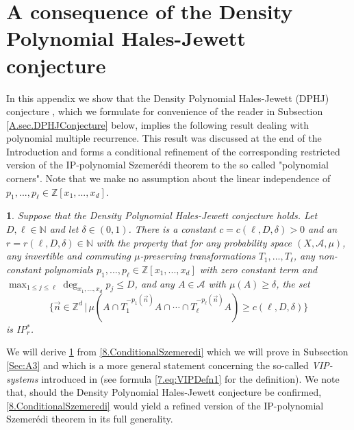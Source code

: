\documentclass[11pt,american,preprint]{elsarticle}
\numberwithin{equation}{section}
\theoremstyle{plain}
\newtheorem{thm}{\protect\theoremname}[section]
\theoremstyle{plain*}
\theoremstyle{plain}
\theoremstyle{plain*}
\theoremstyle{plain}
\theoremstyle{plain*}
\theoremstyle{remark}
\theoremstyle{remark*}
\theoremstyle{remark}
\theoremstyle{remark*}
\theoremstyle{remark}
\theoremstyle{remark*}
\theoremstyle{plain}
\theoremstyle{definition}
\theoremstyle{plain}
\theoremstyle{plain} %
\providecommand{\theoremname}{Theorem}
\newcommand{\N}{\mathbb{N}}
\newcommand{\Z}{\mathbb{Z}}
\begin{document}
\section{A consequence of the Density Polynomial Hales-Jewett conjecture}\label{Sec:A}
 In this appendix we show that the Density Polynomial Hales-Jewett (DPHJ) conjecture \cite[p. 56]{ERTaU}, which we formulate for convenience of the reader in Subsection \ref{A.sec.DPHJConjecture} below, implies the following  result dealing with polynomial multiple recurrence. This result was discussed at the end of the Introduction and forms a conditional refinement of the corresponding restricted version of the  IP-polynomial Szemer{\'e}di theorem to the so called "polynomial corners". Note that we make no assumption about the linear independence of $p_1,...,p_\ell\in\Z[x_1,...,x_d]$. 
\begin{thm}\label{8.thm:ConditionalSzemeredi}
     Suppose that the Density Polynomial Hales-Jewett conjecture holds. Let $D,\ell\in\N$
     and let $\delta\in (0,1)$.  There is a constant $c=c(\ell,D,\delta)>0$ and an $r=r(\ell,D,\delta)\in\N$ with the property that for any 
     probability space  $(X,\mathcal A,\mu)$, any  invertible and commuting $\mu$-preserving transformations  $T_1,...,T_\ell$, any non-constant polynomials $p_1,...,p_\ell\in\Z[x_1,...,x_d]$ with zero constant term and $\max_{1\leq j\leq \ell}\deg_{x_1,...,x_d}p_j\leq D$,
     and any $A\in\mathcal A$ with $\mu(A)\geq \delta$, the set 
     \begin{equation}
\{\vec n\in \Z^d\,|\,\mu(A\cap T_1^{-p_1(\vec n)}A\cap\cdots\cap T_\ell^{-p_\ell(\vec n)}A)\geq c(\ell,D,\delta)\}
     \end{equation}
     is \rm{IP$_r^*$}.
 \end{thm}
We will derive \cref{8.thm:ConditionalSzemeredi} from \cref{8.ConditionalSzemeredi}  which we will prove in Subsection \ref{Sec:A3} and which is a more general statement concerning the so-called \textit{VIP-systems} introduced in \cite{BFM} (see formula \eqref{7.eq:VIPDefn1} for the definition).
We note that, should the Density Polynomial Hales-Jewett conjecture be confirmed, \cref{8.ConditionalSzemeredi} would yield a refined version of the IP-polynomial Szemer{\'e}di theorem in its full generality.
\end{document}
